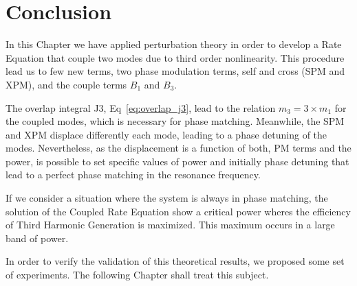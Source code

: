 \section{Conclusion}

In this Chapter we have applied perturbation theory in order to develop a Rate Equation that couple two modes due to third order nonlinearity. This procedure lead us to few new terms, two phase modulation terms, self and cross (SPM and XPM), and the couple terms $B_1$ and $B_3$.

The overlap integral J3, Eq~\ref{eq:overlap_j3}, lead to the relation $m_3 = 3\times m_1$ for the coupled modes, which is necessary for phase matching. Meanwhile, the SPM and XPM displace differently each mode, leading to a phase detuning of the modes. Nevertheless, as the displacement is a function of both, PM terms and the power, is possible to set specific values of power and initially phase detuning that lead to a perfect phase matching in the resonance frequency. 

If we consider a situation where the system is always in phase matching, the solution of the Coupled Rate Equation show a critical power wheres the efficiency of Third Harmonic Generation is maximized. This maximum occurs in a large band of power.

In order to verify the validation of this theoretical results, we proposed some set of experiments. The following Chapter shall treat this subject.  